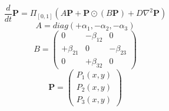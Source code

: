 \documentclass{article}
\begin{document}
\[
\frac{d}{d t} \mathbf{P} = \Pi_{[0,1]} \left( A \mathbf{P} + \mathbf{P} \odot \left( B \mathbf{P} \right) + D \nabla^2 \mathbf{P} \right)
\]
\[
A = {diag}( + \alpha_1, - \alpha_2, - \alpha_3 )
\]
\[
B = \begin{pmatrix}
       0             & - \beta_{1 2}   & 0 \\
       + \beta_{2 1} & 0               & - \beta_{2 3} \\
       0             & + \beta_{3 2}   & 0
 \end{pmatrix}
\]
\[
     \mathbf{P} = \begin{pmatrix} P_1(x,y) \\ P_2(x,y) \\ P_3(x,y) \end{pmatrix}
\]
\end{document}
